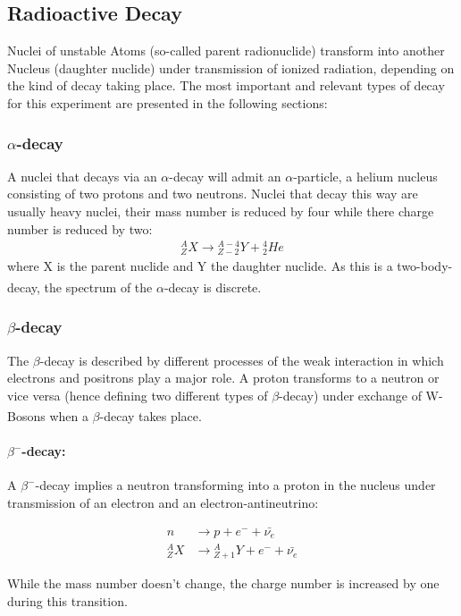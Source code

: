 \documentclass[12pt]{article}
\begin{document}
\subsection{Radioactive Decay}
Nuclei of unstable Atoms (so-called parent radionuclide) transform into another Nucleus (daughter nuclide) under transmission of ionized radiation, depending on the kind of decay taking place. The most important and relevant types of decay for this experiment are presented in the following sections:

\subsubsection{$\alpha$-decay \label{alpha}}

A nuclei that decays via an $\alpha$-decay will admit an $\alpha$-particle, a helium nucleus consisting of two protons and two neutrons. Nuclei that decay this way are usually heavy nuclei, their mass number is reduced by four while there charge number is reduced by two:
\begin{align}
{}_Z^A X \rightarrow {}_{Z-2}^{A-4} Y + {}^4_2He
\end{align}
where X is the parent nuclide and Y the daughter nuclide. As this is a  two-body-decay, the spectrum of the $\alpha$-decay is discrete. \textsuperscript{\cite{dem}}
\subsubsection{$\beta$-decay \label{beta}}
The $\beta$-decay is described by different processes of the weak interaction
in which electrons and positrons play a major role. A proton transforms to a neutron or vice versa (hence defining two different types of $\beta$-decay) under exchange of W-Bosons when a $\beta$-decay takes place. \textsuperscript{\cite{dem}}


\paragraph*{$\beta^-$-decay:} 
A $\beta^-$-decay implies a neutron transforming into a proton in the nucleus under transmission of an electron and an electron-antineutrino:

\begin{align}
n &\rightarrow p + e^- + \bar{\nu_e}\\
{}_Z^A X &\rightarrow {}_{Z+1}^A Y + e^- + \bar{\nu_e}
\end{align}

While the mass number doesn't change, the charge number is increased by one during this transition.
\end{document}
